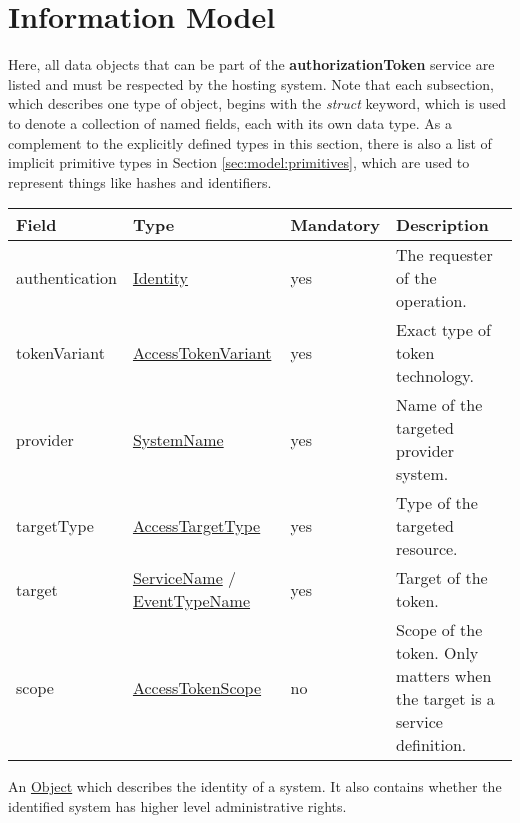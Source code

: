 \documentclass[a4paper]{arrowhead}
\newcommand{\pref}[1]{{\textcolor{ArrowheadGrey}{\hyperref[sec:model:primitives:#1]{#1}}}}
\begin{document}
\clearpage

\section{Information Model}
\label{sec:model}

Here, all data objects that can be part of the \textbf{authorizationToken} service are listed and must be respected by the hosting system.
Note that each subsection, which describes one type of object, begins with the \textit{struct} keyword, which is used to denote a collection of named fields, each with its own data type.
As a complement to the explicitly defined types in this section, there is also a list of implicit primitive types in Section \ref{sec:model:primitives}, which are used to represent things like hashes and identifiers.

{}

\begin{table}[ht!]
\begin{tabularx}{\textwidth}{| p{3cm} | p{4.5cm} | p{2cm} | X |} \hline
\rowcolor{gray!33} Field & Type & Mandatory & Description \\ \hline
authentication & \hyperref[sec:model:Identity]{Identity} & yes & The requester of the operation. \\ \hline
tokenVariant & \pref{AccessTokenVariant} & yes & Exact type of token technology. \\ \hline
provider & \pref{SystemName} & yes & Name of the targeted provider system. \\ \hline
targetType & \pref{AccessTargetType} & yes & Type of the targeted resource. \\ \hline
target & \pref{ServiceName} / \pref{EventTypeName} & yes & Target of the token. \\ \hline
scope & \hyperref[sec:model:AccessTokenScope]{AccessTokenScope} & no & Scope of the token. Only matters when the target is a service definition. \\ \hline
\end{tabularx}
\end{table}


An \pref{Object} which describes the identity of a system. It also contains whether the identified system has higher level administrative rights.

\end{document}
